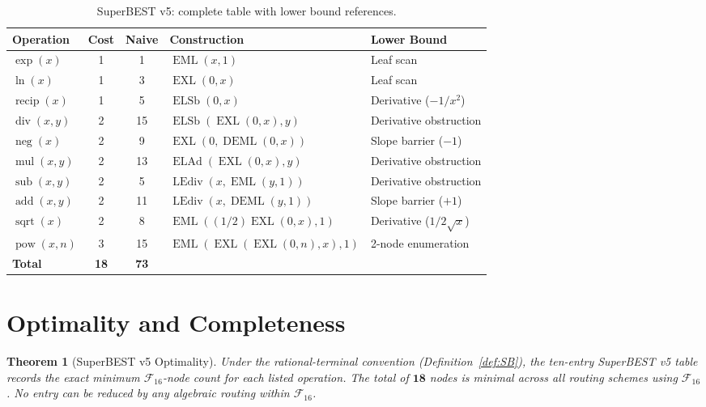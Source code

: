 \documentclass[12pt,a4paper]{article}
\newtheorem{theorem}{Theorem}[section]
\theoremstyle{definition}
\newcommand{\EML}{\operatorname{EML}}
\newcommand{\EXL}{\operatorname{EXL}}
\newcommand{\DEML}{\operatorname{DEML}}
\newcommand{\ELAd}{\operatorname{ELAd}}
\newcommand{\ELSb}{\operatorname{ELSb}}
\newcommand{\LEdiv}{\operatorname{LEdiv}}
\newcommand{\recip}{\operatorname{recip}}
\newcommand{\divop}{\operatorname{div}}
\newcommand{\mulop}{\operatorname{mul}}
\newcommand{\subop}{\operatorname{sub}}
\newcommand{\addop}{\operatorname{add}}
\newcommand{\negop}{\operatorname{neg}}
\newcommand{\powop}{\operatorname{pow}}
\newcommand{\sqrtop}{\operatorname{sqrt}}
\newcommand{\F}{\mathcal{F}_{16}}
\begin{document}
\begin{table}[h]
\centering
\caption{SuperBEST v5: complete table with lower bound references.}
\label{tab:v5-final}
\smallskip
\begin{tabular}{@{}lccll@{}}
\toprule
\textbf{Operation} & \textbf{Cost} & \textbf{Naive} & \textbf{Construction} & \textbf{Lower Bound} \\
\midrule
$\exp(x)$        & 1 &  1 & $\EML(x,1)$                   & Leaf scan               \\
$\ln(x)$         & 1 &  3 & $\EXL(0,x)$                   & Leaf scan               \\
$\recip(x)$      & 1 &  5 & $\ELSb(0,x)$                  & Derivative ($-1/x^2$)   \\
$\divop(x,y)$    & 2 & 15 & $\ELSb(\EXL(0,x),y)$          & Derivative obstruction  \\
$\negop(x)$      & 2 &  9 & $\EXL(0,\DEML(0,x))$          & Slope barrier ($-1$)    \\
$\mulop(x,y)$    & 2 & 13 & $\ELAd(\EXL(0,x),y)$          & Derivative obstruction  \\
$\subop(x,y)$    & 2 &  5 & $\LEdiv(x,\EML(y,1))$         & Derivative obstruction  \\
$\addop(x,y)$    & 2 & 11 & $\LEdiv(x,\DEML(y,1))$        & Slope barrier ($+1$)    \\
$\sqrtop(x)$     & 2 &  8 & $\EML((1/2)\EXL(0,x),1)$      & Derivative ($1/2\sqrt{x}$) \\
$\powop(x,n)$    & 3 & 15 & $\EML(\EXL(\EXL(0,n),x),1)$   & 2-node enumeration      \\
\midrule
\textbf{Total}   & \textbf{18} & \textbf{73} & & \\
\bottomrule
\end{tabular}

\medskip
{}
\end{table}

\section{Optimality and Completeness}
\label{sec:optimality}

\begin{theorem}[SuperBEST v5 Optimality]
\label{thm:main}
Under the rational-terminal convention (Definition~\ref{def:SB}),
the ten-entry SuperBEST v5 table records the exact minimum $\mathcal{F}_{16}$-node
count for each listed operation.
The total of $\mathbf{18}$ nodes is minimal across all routing schemes using $\F$.
No entry can be reduced by any algebraic routing within $\F$.
\end{theorem}
\end{document}
